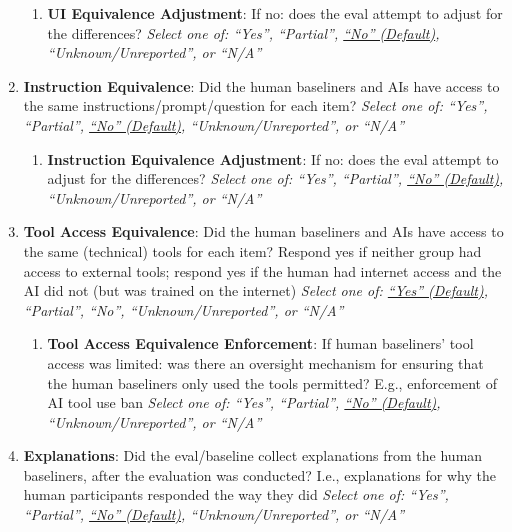 \documentclass{article}
\begin{document}
\begin{enumerate}[leftmargin=30pt, topsep=0pt, itemsep=0pt]
\begin{enumerate}
        \item \textbf{UI Equivalence Adjustment}: If no: does the eval attempt to adjust for the differences?
        \newline \textit{Select one of: ``Yes'', ``Partial'', \ul{``No'' (Default)}, ``Unknown/Unreported'', or ``N/A''}
    \end{enumerate}
    
    \item \textbf{Instruction Equivalence}: Did the human baseliners and AIs have access to the same instructions/prompt/question for each item?
    \newline \textit{Select one of: ``Yes'', ``Partial'', \ul{``No'' (Default)}, ``Unknown/Unreported'', or ``N/A''}
    \begin{enumerate}
        \item \textbf{Instruction Equivalence Adjustment}: If no: does the eval attempt to adjust for the differences?
        \newline \textit{Select one of: ``Yes'', ``Partial'', \ul{``No'' (Default)}, ``Unknown/Unreported'', or ``N/A''}
    \end{enumerate}
    
    \item \textbf{Tool Access Equivalence}: Did the human baseliners and AIs have access to the same (technical) tools for each item? Respond yes if neither group had access to external tools; respond yes if the human had internet access and the AI did not (but was trained on the internet)
    \newline \textit{Select one of: \ul{``Yes'' (Default)}, ``Partial'', ``No'', ``Unknown/Unreported'', or ``N/A''}
    \begin{enumerate}
        \item \textbf{Tool Access Equivalence Enforcement}: If human baseliners' tool access was limited: was there an oversight mechanism for ensuring that the human baseliners only used the tools permitted? E.g., enforcement of AI tool use ban
        \newline \textit{Select one of: ``Yes'', ``Partial'', \ul{``No'' (Default)}, ``Unknown/Unreported'', or ``N/A''}
    \end{enumerate}
    
    \item \textbf{Explanations}: Did the eval/baseline collect explanations from the human baseliners, after the evaluation was conducted? I.e., explanations for why the human participants responded the way they did
    \newline \textit{Select one of: ``Yes'', ``Partial'', \ul{``No'' (Default)}, ``Unknown/Unreported'', or ``N/A''}
\end{enumerate}
\end{document}
